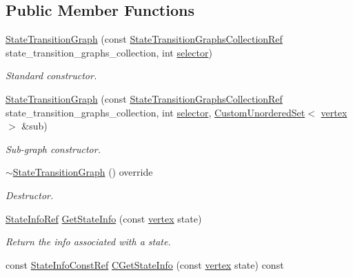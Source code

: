 \subsection*{Public Member Functions}
\begin{DoxyCompactItemize}
\item 
\hyperlink{structStateTransitionGraph_a5e1e81273324c5bd51d8bb3b60213e27}{State\+Transition\+Graph} (const \hyperlink{state__transition__graph_8hpp_a2613a37dfdde13c61d36bfaba91f433e}{State\+Transition\+Graphs\+Collection\+Ref} state\+\_\+transition\+\_\+graphs\+\_\+collection, int \hyperlink{structgraph_ab06c362711200ca8c15e3d85fef7957b}{selector})
\begin{DoxyCompactList}\small\item\em Standard constructor. \end{DoxyCompactList}\item 
\hyperlink{structStateTransitionGraph_a3d68a50a1db1f5d01e3c24564f9f9d9f}{State\+Transition\+Graph} (const \hyperlink{state__transition__graph_8hpp_a2613a37dfdde13c61d36bfaba91f433e}{State\+Transition\+Graphs\+Collection\+Ref} state\+\_\+transition\+\_\+graphs\+\_\+collection, int \hyperlink{structgraph_ab06c362711200ca8c15e3d85fef7957b}{selector}, \hyperlink{classCustomUnorderedSet}{Custom\+Unordered\+Set}$<$ \hyperlink{graph_8hpp_abefdcf0544e601805af44eca032cca14}{vertex} $>$ \&sub)
\begin{DoxyCompactList}\small\item\em Sub-\/graph constructor. \end{DoxyCompactList}\item 
\hyperlink{structStateTransitionGraph_af1d4a97008d17198f4f7d7f80466c57a}{$\sim$\+State\+Transition\+Graph} () override
\begin{DoxyCompactList}\small\item\em Destructor. \end{DoxyCompactList}\item 
\hyperlink{state__transition__graph_8hpp_aeb406353b516fb2c706df12defd64c99}{State\+Info\+Ref} \hyperlink{structStateTransitionGraph_a3499813fbff2a9cb30b5142fb570652c}{Get\+State\+Info} (const \hyperlink{graph_8hpp_abefdcf0544e601805af44eca032cca14}{vertex} state)
\begin{DoxyCompactList}\small\item\em Return the info associated with a state. \end{DoxyCompactList}\item 
const \hyperlink{state__transition__graph_8hpp_a50240fded93adab729e333c2b8090a8b}{State\+Info\+Const\+Ref} \hyperlink{structStateTransitionGraph_a74d280e7a12edb40d1fa6a6d9bfd44c3}{C\+Get\+State\+Info} (const \hyperlink{graph_8hpp_abefdcf0544e601805af44eca032cca14}{vertex} state) const

\end{DoxyCompactItemize}
